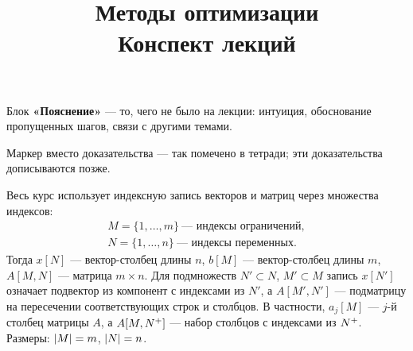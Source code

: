 \documentclass[12pt,a4paper]{article}
\title{\textbf{Методы оптимизации}\\[0.3em]\large Конспект лекций}
\author{}
\date{}
\begin{document}
\maketitle
\thispagestyle{empty}

\begin{idea}[title={Обозначения в конспекте}]
Блок \textbf{«Пояснение»} — то, чего не было на лекции: интуиция, обоснование
пропущенных шагов, связи с другими темами.

\medskip
Маркер \plusplus{} вместо доказательства — так помечено в тетради; эти доказательства
дописываются позже.
\end{idea}

\begin{idea}[title={Индексная запись}]
Весь курс использует индексную запись векторов и матриц через множества индексов:
\begin{gather*}
  M = \{1, \dots, m\} \ \text{— индексы ограничений}, \\
  N = \{1, \dots, n\} \ \text{— индексы переменных} .
\end{gather*}
Тогда $x[N]$ — вектор-столбец длины $n$, $b[M]$ — вектор-столбец длины $m$,
$A[M,N]$ — матрица $m \times n$. Для подмножеств $N' \subset N$, $M' \subset M$
запись $x[N']$ означает подвектор из компонент с индексами из $N'$, а $A[M',N']$ —
подматрицу на пересечении соответствующих строк и столбцов. В частности,
$a_j[M]$ — $j$-й столбец матрицы $A$, а $A[M,N^{+}]$ — набор столбцов с индексами
из $N^{+}$. Размеры: $\left\lvert M \right\rvert = m$, $\left\lvert N \right\rvert = n$.
\end{idea}

\tableofcontents
\newpage

\renewcommand{\thesubsection}{\S\arabic{subsection}}








\newpage






\newpage




\newpage



\end{document}
